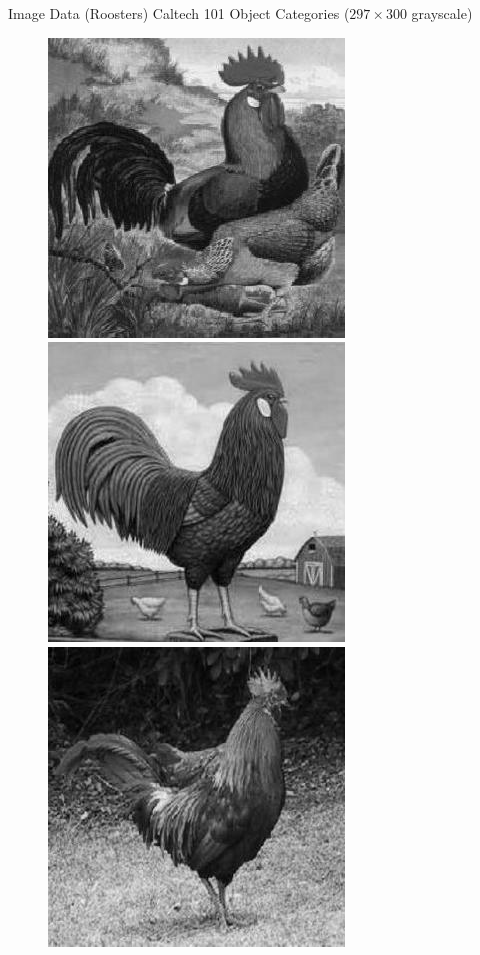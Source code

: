 \documentclass{beamer}
\begin{document}
\begin{frame}{Image Data (Roosters)}
  Caltech 101 Object Categories \cite{fei2007learning} ($297 \times
  300$ grayscale)
  \begin{figure}
    \centering
    \includegraphics[scale=.35]{roosterrs-image_0001.jpg}
    \includegraphics[scale=.35]{roosterrs-image_0002.jpg} \\
    \includegraphics[scale=.35]{roosterrs-image_0003.jpg}

\end{figure}
\end{frame}
\end{document}
